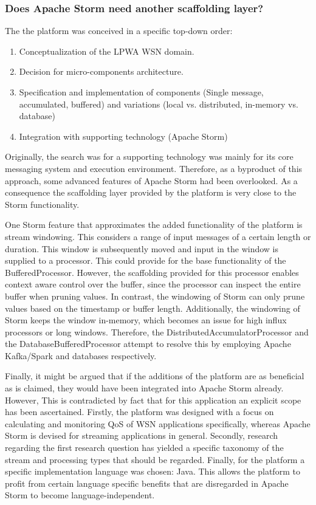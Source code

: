 \subsubsection{Does Apache Storm need another scaffolding layer?}
The the platform was conceived in a specific top-down order:
\begin{enumerate}
\nospace
\item Conceptualization of the LPWA WSN domain.
\item Decision for micro-components architecture.
\item Specification and implementation of components (Single message, accumulated, buffered) and variations (local vs. distributed, in-memory vs. database)
\item Integration with supporting technology (Apache Storm)
\end{enumerate}
Originally, the search was for a supporting technology was mainly for its core messaging system and execution environment. Therefore, as a byproduct of this approach, some advanced features of Apache Storm had been overlooked. As a consequence the scaffolding layer provided by the platform is very close to the Storm functionality.

One Storm feature that approximates the added functionality of the platform is stream windowing. This considers a range of input messages of a certain length or duration. This window is subsequently moved and input in the window is supplied to a processor. This could provide for the base functionality of the BufferedProcessor. However, the scaffolding provided for this processor enables context aware control over the buffer, since the processor can inspect the entire buffer when pruning values. In contrast, the windowing of Storm  can only prune values based on the timestamp or buffer length. Additionally, the windowing of Storm keeps the window in-memory, which becomes an issue for high influx processors or long windows. Therefore, the DistributedAccumulatorProcessor and the DatabaseBufferedProcessor attempt to resolve this by employing Apache Kafka/Spark and databases respectively.

Finally, it might be argued that if the additions of the platform are as beneficial as is claimed, they would have been integrated into Apache Storm already. However, This is contradicted by fact that for this application an explicit scope has been ascertained. Firstly, the platform was designed with a focus on calculating and monitoring QoS of WSN applications specifically, whereas Apache Storm is devised for streaming applications in general. Secondly, research regarding the first research question has yielded a specific taxonomy of the stream and processing types that should be regarded. Finally, for the platform a specific implementation language was chosen: Java. This allows the platform to profit from certain language specific benefits that are disregarded in Apache Storm to become language-independent.
		
